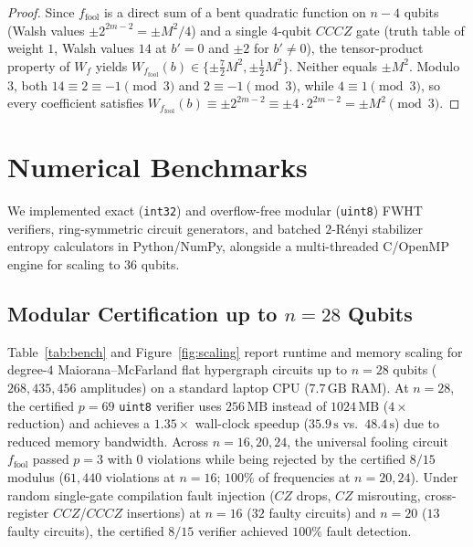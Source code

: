 \documentclass[11pt,a4paper]{article}
\begin{document}
\begin{proof}
Since $f_{\mathrm{fool}}$ is a direct sum of a bent quadratic function on $n-4$ qubits (Walsh values $\pm 2^{2m-2} = \pm M^2/4$) and a single $4$-qubit $CCCZ$ gate (truth table of weight $1$, Walsh values $14$ at $b'=0$ and $\pm 2$ for $b'\ne 0$), the tensor-product property of $W_f$ yields $W_{f_{\mathrm{fool}}}(b) \in \{\pm \frac{7}{2}M^2, \pm \frac{1}{2}M^2\}$. Neither equals $\pm M^2$. Modulo $3$, both $14 \equiv 2 \equiv -1 \pmod 3$ and $2 \equiv -1 \pmod 3$, while $4 \equiv 1 \pmod 3$, so every coefficient satisfies $W_{f_{\mathrm{fool}}}(b) \equiv \pm 2^{2m-2} \equiv \pm 4\cdot 2^{2m-2} = \pm M^2 \pmod 3$.
\end{proof}

\section{Numerical Benchmarks}
\label{sec:benchmarks}

We implemented exact (\texttt{int32}) and overflow-free modular (\texttt{uint8}) FWHT verifiers, ring-symmetric circuit generators, and batched $2$-R\'enyi stabilizer entropy calculators in Python/NumPy, alongside a multi-threaded C/OpenMP engine for scaling to $36$ qubits.

\subsection{Modular Certification up to $n = 28$ Qubits}
Table~\ref{tab:bench} and Figure~\ref{fig:scaling} report runtime and memory scaling for degree-$4$ Maiorana--McFarland flat hypergraph circuits up to $n = 28$ qubits ($268{,}435{,}456$ amplitudes) on a standard laptop CPU ($7.7\,\text{GB}$ RAM). At $n=28$, the certified $p=69$ \texttt{uint8} verifier uses $256\,\text{MB}$ instead of $1024\,\text{MB}$ ($4\times$ reduction) and achieves a $1.35\times$ wall-clock speedup ($35.9\,\text{s}$ vs.\ $48.4\,\text{s}$) due to reduced memory bandwidth. Across $n = 16, 20, 24$, the universal fooling circuit $f_{\mathrm{fool}}$ passed $p=3$ with $0$ violations while being rejected by the certified $8/15$ modulus ($61{,}440$ violations at $n=16$; $100\%$ of frequencies at $n=20, 24$). Under random single-gate compilation fault injection ($CZ$ drops, $CZ$ misrouting, cross-register $CCZ$/$CCCZ$ insertions) at $n=16$ ($32$ faulty circuits) and $n=20$ ($13$ faulty circuits), the certified $8/15$ verifier achieved $100\%$ fault detection.
\end{document}
